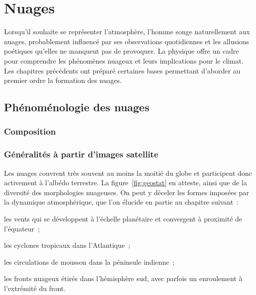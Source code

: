 \chapter{Nuages}


\bk
Lorsqu'il souhaite se représenter l'atmosphère, l'homme songe naturellement aux nuages, probablement influencé par ses observations quotidiennes et les allusions poétiques qu'elles ne manquent pas de provoquer. La physique offre un cadre pour comprendre les phénomènes nuageux et leurs implications pour le climat. Les chapitres précédents ont préparé certaines bases permettant d'aborder au premier ordre la formation des nuages.  

\mk
\section{Phénoménologie des nuages}

\sk
\subsection{Composition}
	

 
\sk
\subsection{Généralités à partir d'images satellite}

\sk
Les nuages couvrent très souvent au moins la moitié du globe et participent donc activement à l'albédo terrestre. La figure~\ref{fig:geostat} en atteste, ainsi que de la diversité des morphologies nuageuses. On peut y déceler les formes imposées par la dynamique atmosphérique, que l'on élucide en partie au chapitre suivant~:
\begin{citemize}
\item les vents qui se développent à l'échelle planétaire et convergent à proximité de l'équateur~;
\item les cyclones tropicaux dans l'Atlantique~;
\item les circulations de mousson dans la péninsule indienne~;
\item les fronts nuageux étirés dans l'hémisphère sud, avec parfois un enroulement à l'extrémité du front.
\end{citemize}


